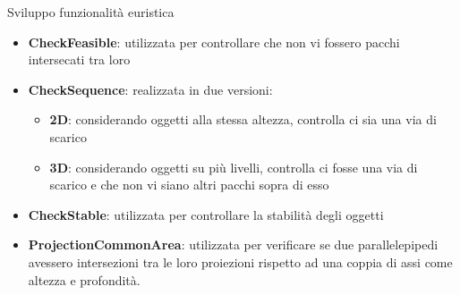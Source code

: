 \documentclass{beamer}
\begin{document}
\begin{frame}{Sviluppo funzionalit\`a euristica}
	\begin{itemize}
		\item \textbf{CheckFeasible}: utilizzata per controllare che non vi fossero pacchi intersecati tra loro
		\item \textbf{CheckSequence}: realizzata in due versioni:
			  \begin{itemize}
				  \item \textbf{2D}: considerando oggetti alla stessa altezza, controlla ci sia una via di scarico
				  \item \textbf{3D}: considerando oggetti su pi\`u livelli, controlla ci fosse una via di scarico e che non vi siano altri pacchi sopra di esso
			  \end{itemize}
		\item \textbf{CheckStable}: utilizzata per controllare la stabilit\`a degli oggetti
		\item \textbf{ProjectionCommonArea}: utilizzata per verificare se due parallelepipedi avessero intersezioni tra le loro proiezioni rispetto ad una coppia di assi come altezza e profondit\`a.	
	\end{itemize}
\end{frame}
\end{document}
